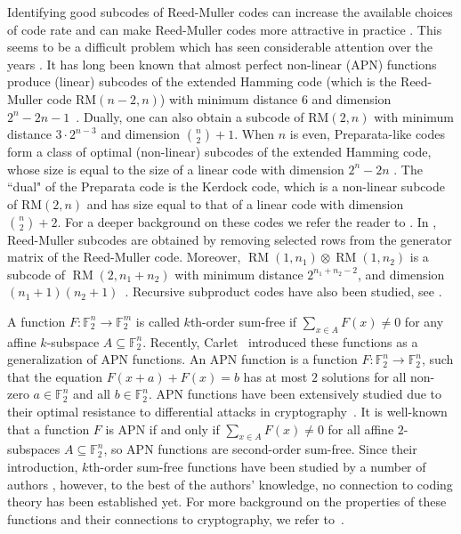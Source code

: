 \documentclass[12pt]{article}
\theoremstyle{definition}
\newcommand{\F}{\mathbb F}
\newcommand{\Fpnv}{\mathbb{F}_2^n}
\DeclareMathOperator{\RM}{RM}
\newcounter{numb}
\begin{document}
Identifying good subcodes of Reed-Muller codes can increase the available choices of code rate and can make Reed-Muller codes more attractive in practice \cite{subcodes_recursive}. This seems to be a difficult problem which has seen considerable attention over the years \cite{carletcharpinzinoviev1998}. It has long been known that almost perfect non-linear (APN) functions produce (linear) subcodes of the extended Hamming code (which is the Reed-Muller code RM$(n-2, n)$) with minimum distance 6 and dimension $2^n - 2n - 1$~\cite{carletcharpinzinoviev1998}. Dually, one can also obtain a subcode of RM$(2, n)$ with minimum distance $3\cdot 2^{n-3}$ and dimension $\binom{n}{2} + 1$. When $n$ is even, Preparata-like codes form a class of optimal (non-linear) subcodes of the extended Hamming code, whose size is equal to the size of a linear code with dimension $2^n - 2n$ \cite{BVW, parallelisms_1973}.  The ``dual" of the Preparata code is the Kerdock code, which is a non-linear subcode of RM$(2, n)$ and has size equal to that of a linear code with dimension $\binom{n}{2} + 2$. For a deeper background on these codes we refer the reader to \cite{MacWilliams1977TheTO}. In \cite{Jamali2022LowComplexityDO, Construction_of_RM_subcodes}, Reed-Muller subcodes are obtained by removing selected rows from the generator matrix of the Reed-Muller code. Moreover, $\RM(1,n_1)\otimes \RM(1,n_2)$ is a subcode of $\RM(2,n_1+n_2)$ with minimum distance $2^{n_1+n_2-2}$, and dimension $(n_1+1)(n_2+1)$~\cite{salomon}. Recursive subproduct codes have also been studied, see \cite{subcodes_recursive}.

A function $F\colon\F_2^n\to \F_2^m$ is called $k$th-order sum-free if $\sum_{x \in A}F(x) \neq 0$ for any affine $k$-subspace $A \subseteq \F_{2}^n$. Recently, Carlet~\cite{carlet2025inverse,carlet2025generalizations} introduced these functions as a generalization of APN functions.  An APN function is a function $F \colon \Fpnv \to \Fpnv$, such that the equation $F(x+a)+F(x)=b$ has at most $2$ solutions for all non-zero $a\in \Fpnv$ and all $b\in \Fpnv$. APN functions have been extensively studied due to their optimal resistance to differential attacks in cryptography~\cite{eurocrypt-1993-2628}. It is well-known~\cite{brinkmannleander2008,hou2006} that a function $F$ is APN if and only if $\sum_{x\in A} F(x) \ne 0$ for all affine $2$-subspaces $A\subseteq \Fpnv$, so APN functions are second-order sum-free. Since their introduction, $k$th-order sum-free functions have been studied by a number of authors \cite{carlet2025tDegree,carlet2025inverse,carlet2025generalizations,ebeling2024,houzhao2025b,houzhao2025a,kaspers2026WCC}, however, to the best of the authors' knowledge, no connection to coding theory has been established yet. For more background on the properties of these functions and their connections to cryptography, we refer to~\cite{carlet2025generalizations}.
\end{document}
